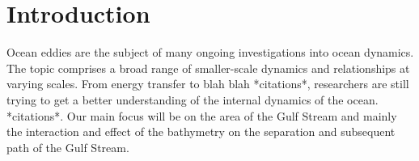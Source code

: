 \documentclass[..\EOYR.tex]{subfiles}
\begin{document}
\section{Introduction}

Ocean eddies are the subject of many ongoing investigations into ocean dynamics. The topic comprises a broad range of smaller-scale dynamics and relationships at varying scales. From energy transfer to blah blah *citations*, researchers are still trying to get a better understanding of the internal dynamics of the ocean. *citations*. Our main focus will be on the area of the Gulf Stream and mainly the interaction and effect of the bathymetry on the separation and subsequent path of the Gulf Stream.
\end{document}
